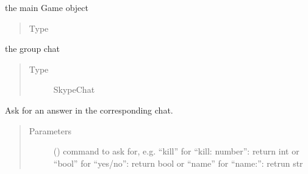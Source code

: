 \documentclass[letterpaper,10pt,english]{sphinxmanual}
\begin{document}
\begin{fulllineitems}
\begin{fulllineitems}
\label{\detokenize{chatwolf:chatwolf.skypecommands.SkypeCommands.game}}
the main Game object
\begin{quote}\begin{description}
\item[{Type}] \leavevmode
{\hyperref[\detokenize{chatwolf:chatwolf.game.Game}]{}}

\end{description}\end{quote}

\end{fulllineitems}


\begin{fulllineitems}
\label{\detokenize{chatwolf:chatwolf.skypecommands.SkypeCommands.chat}}
the group chat
\begin{quote}\begin{description}
\item[{Type}] \leavevmode
SkypeChat

\end{description}\end{quote}

\end{fulllineitems}


\begin{fulllineitems}
\label{\detokenize{chatwolf:chatwolf.skypecommands.SkypeCommands.ask}}
Ask for an answer in the corresponding chat.
\begin{quote}\begin{description}
\item[{Parameters}] \leavevmode
{} () \textendash{} command to ask for, e.g. “kill” for “kill: number”: return int
or “bool” for “yes/no”: return bool
or “name” for “name:”: retrun str


\end{description}
\end{quote}
\end{fulllineitems}
\end{fulllineitems}
\end{document}
